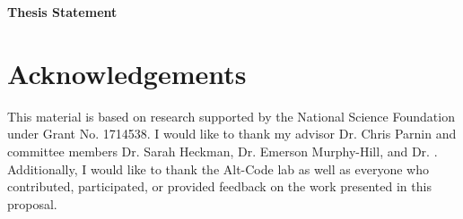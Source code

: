 \documentclass[runningheads]{llncs}
\begin{document}

\noindent
\textbf{\large Thesis Statement} \\












\section{Acknowledgements}

This material is based on research supported by the National Science Foundation under Grant No. 1714538. I would like to thank my advisor Dr. Chris Parnin and committee members Dr. Sarah Heckman, Dr. Emerson Murphy-Hill, and Dr. . Additionally, I would like to thank the Alt-Code lab as well as everyone who contributed, participated, or provided feedback on the work presented in this proposal.



%
%
%
% 
% 
%


\end{document}
